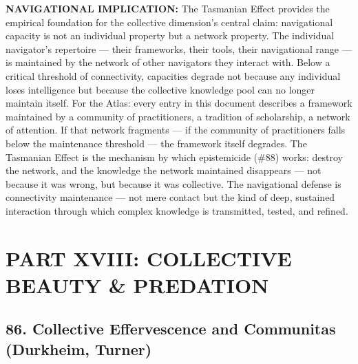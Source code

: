 \textbf{NAVIGATIONAL IMPLICATION:} The Tasmanian Effect provides the empirical foundation for the collective dimension's central claim: navigational capacity is not an individual property but a network property. The individual navigator's repertoire — their frameworks, their tools, their navigational range — is maintained by the network of other navigators they interact with. Below a critical threshold of connectivity, capacities degrade not because any individual loses intelligence but because the collective knowledge pool can no longer maintain itself. For the Atlas: every entry in this document describes a framework maintained by a community of practitioners, a tradition of scholarship, a network of attention. If that network fragments — if the community of practitioners falls below the maintenance threshold — the framework itself degrades. The Tasmanian Effect is the mechanism by which epistemicide (\#88) works: destroy the network, and the knowledge the network maintained disappears — not because it was wrong, but because it was collective. The navigational defense is connectivity maintenance — not mere contact but the kind of deep, sustained interaction through which complex knowledge is transmitted, tested, and refined.


\bigskip\noindent\makebox[\textwidth]{\color{rulegray}\rule{5cm}{0.3pt}}\bigskip


\chapter*{PART XVIII: COLLECTIVE BEAUTY \& PREDATION}


\section*{86. Collective Effervescence and Communitas (Durkheim, Turner)}


